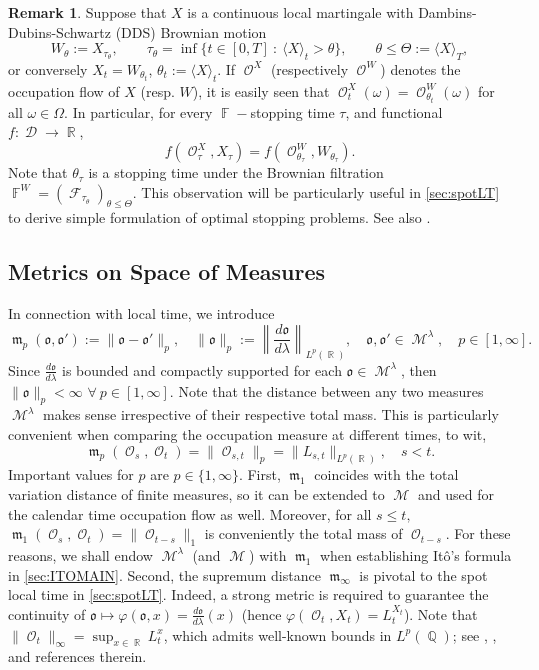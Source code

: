 \documentclass[11pt]{article}
\def\mo{\mathfrak{o}}
\theoremstyle{plain}
\theoremstyle{definition}
\newtheorem{remark}{Remark}
\DeclareMathOperator{\F}{\mathbb{F}}
\DeclareMathOperator{\Q}{\mathbb{Q}}
\DeclareMathOperator{\R}{\mathbb{R}}
\DeclareMathOperator{\calD}{\mathcal{D}}
\DeclareMathOperator{\calF}{\mathcal{F}}
\DeclareMathOperator{\calM}{\mathcal{M}}
\DeclareMathOperator{\calO}{\mathcal{O}}
\DeclareMathOperator{\frakm}{\mathfrak{m}}
\begin{document}
\begin{remark}\label{rem:DDS}
 Suppose that  $X$ is a continuous  local martingale with Dambins-Dubins-Schwartz (DDS) Brownian motion
 $$W_\theta := X_{\tau_\theta}, \qquad 
\tau_\theta = \inf\{t \in [0,T] \ : \ \langle X \rangle_t > \theta\},\qquad \theta \le \Theta :=  \langle X\rangle_T , $$ or conversely $X_t = W_{\theta_t}$, $\theta_t := \langle X\rangle_t$. If $\calO^X$ (respectively $\calO^W$) denotes the occupation flow of $X$ (resp. $W$), it is easily seen that $\calO_t^X(\omega)=\calO_{\theta_t}^W(\omega)$ for all $\omega \in \Omega$.   
 In particular, for every  $\F-$stopping time $\tau$, and functional $f:\calD\to \R$,
 \begin{equation}
  f(\calO_\tau^{X},X_\tau) = f(\calO_{\theta_{\tau}}^W,W_{\theta_{\tau}}). 
 \end{equation}
Note that $\theta_{\tau}$ is a stopping time under the Brownian filtration $\F^W = (\calF_{\tau_\theta})_{\theta\le \Theta}$. This observation will be particularly useful  in \cref{sec:spotLT} to derive simple 
formulation of %
optimal stopping problems.   
See also \cite[Chapter IV]{PeskirShiryaev}.      
\end{remark}

\subsection{Metrics on Space of Measures}\label{sec:metrics}
In connection with local time, we introduce  
 \begin{equation}\label{eq:metrics}
    \frakm_p(\mo,\mo') :=  \lVert \mo-\mo' \rVert_{p}, \quad \lVert \mo \rVert_{p} := \left\lVert \frac{d\mo}{d\lambda} \right\rVert_{L^{p}(\R)}, \quad \mo,\mo' \in \calM^{\lambda}, \quad p\in [1,\infty].  
 \end{equation}
 Since $\frac{d\mo}{d\lambda}$ is bounded and compactly supported for each $\mo\in \calM^{\lambda}$, then $\lVert \mo\rVert_p <\infty$  $\forall \ p\in [1,\infty]$. 
 Note that the distance between any two measures $ \calM^{\lambda}$ makes sense irrespective of their respective total mass. 
This is particularly convenient when comparing the occupation measure 
at different times, to wit,  
$$  \frakm_p(\calO_s,\calO_t) = \lVert\calO_{s,t}\rVert_p  = \lVert L_{s,t}\rVert_{L^{p}(\R)}, \quad  s<t. $$
Important values for $p$ are 
$p\in \{1,\infty\}$. First,  $\frakm_1$ 
coincides with the total variation distance of finite measures, so it can  be extended to $\calM$ and used for the calendar time occupation flow as well. Moreover, for all $s\le t,$  $\frakm_1(\calO_s,\calO_t) = \lVert \calO_{t-s} \rVert_1$ is conveniently the total mass of $ \calO_{t-s}$.  
For these reasons, we shall endow $\calM^{\lambda}$ (and $\calM$)  with $\frakm_1$   when establishing Itô's formula in \cref{sec:ITOMAIN}. 
Second,  the supremum distance $\frakm_{\infty}$ is pivotal to  
the spot local time in \cref{sec:spotLT}. 
Indeed, a strong metric is required to guarantee the continuity of $\mo \mapsto  \varphi(\mo,x) = \frac{d\mo}{d\lambda}(x)$ (hence $  \varphi(\calO_t,X_t)  = L_t^{X_t}$). 
Note that 
$\lVert\calO_{t}\rVert_{\infty} = \sup_{x\in \R} L^x_t$, which admits well-known bounds in $L^p(\Q)$; 
see \cite[XI]{RevuzYor}, \cite{BarlowYor}, and references therein.  
\end{document}
